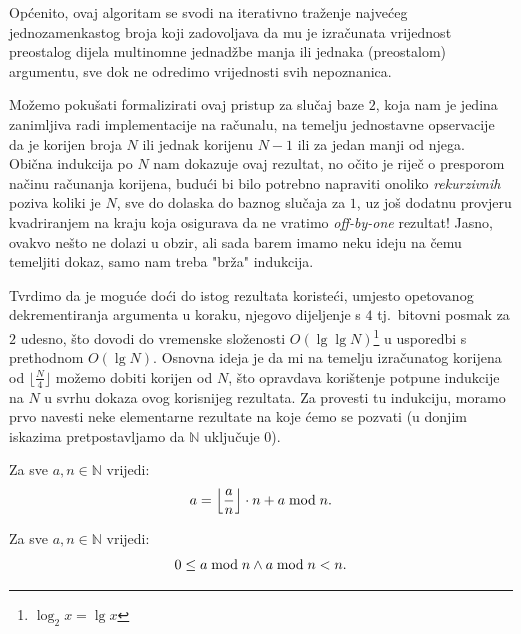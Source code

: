 \documentclass[12pt]{scrartcl}
\begin{document}
Općenito, ovaj algoritam se svodi na iterativno traženje najvećeg jednozamenkastog
broja koji zadovoljava da mu je izračunata vrijednost preostalog dijela multinomne jednadžbe manja ili jednaka (preostalom) argumentu, sve
dok ne odredimo vrijednosti svih nepoznanica.

Možemo pokušati formalizirati ovaj pristup za slučaj baze $2$, koja nam je jedina zanimljiva radi implementacije na računalu, na temelju
jednostavne opservacije da je korijen broja $N$ ili jednak korijenu $N-1$ ili za jedan manji od njega. Obična indukcija po $N$ nam dokazuje
ovaj rezultat, no očito je riječ o presporom načinu računanja korijena, budući bi bilo potrebno napraviti onoliko \emph{rekurzivnih}
poziva koliki je $N$, sve do dolaska do baznog slučaja za $1$, uz još dodatnu provjeru kvadriranjem na kraju koja osigurava da ne vratimo
\textsl{off-by-one} rezultat! Jasno, ovakvo nešto ne dolazi u obzir, ali sada barem imamo neku ideju na čemu temeljiti dokaz, samo nam treba
"brža" indukcija.

Tvrdimo da je moguće doći do istog rezultata koristeći, umjesto opetovanog dekrementiranja argumenta u koraku, njegovo dijeljenje s $4$
tj.\ bitovni posmak za $2$ udesno, što dovodi do vremenske složenosti $O(\lg\lg N)$\footnote{$\log_2 x=\lg x$} u usporedbi s prethodnom $O(\lg N)$. Osnovna ideja je
da mi na temelju izračunatog korijena od $\lfloor\frac{N}{4}\rfloor$ možemo dobiti korijen od $N$, što opravdava korištenje potpune
indukcije na $N$ u svrhu dokaza ovog korisnijeg rezultata. Za provesti tu indukciju, moramo prvo navesti neke elementarne rezultate
na koje ćemo se pozvati (u donjim iskazima pretpostavljamo da $\mathbb{N}$ uključuje $0$).

\begin{lema}
    Za sve $a,n\in\mathbb{N}$ vrijedi:
    \begin{equation}\label{lm:1}
        a=\left\lfloor\frac{a}{n}\right\rfloor\cdot n + a \bmod n\text.
    \end{equation}
\end{lema}

\begin{lema}
    Za sve $a,n\in\mathbb{N}$ vrijedi:
    \begin{equation}\label{lm:2}
        0 \leq a \bmod n \land a \bmod n < n\text.
    \end{equation}
\end{lema}
\end{document}
